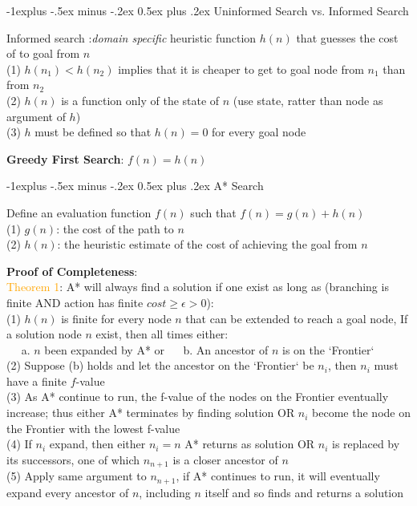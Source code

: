 \documentclass[10pt,landscape]{article}
\makeatletter
\renewcommand{\subsection}{\@startsection{subsection}{2}{0mm}%
                                {-1explus -.5ex minus -.2ex}%
                                {0.5ex plus .2ex}%
                                {\normalfont\normalsize\bfseries}}
\makeatother
\begin{document}
\begin{multicols}{2}
\subsection{Uninformed Search vs. Informed Search}

Informed search :\textit{domain specific} heuristic function $h(n)$ that guesses the cost of to goal from $n$ \\
(1) $h(n_1) < h(n_2)$ implies that it is cheaper to get to goal node from $n_1$ than from $n_2$ \\
(2) $h(n)$ is a function only of the state of $n$ (use state, ratter than node as argument of $h$) \\
(3) $h$ must be defined so that $h(n) = 0$ for every goal node

\textbf{Greedy First Search}: $f(n) = h(n)$



\subsection{A* Search}

Define an evaluation function $f(n)$ such that $f(n) = g(n) + h(n)$ \\
(1) $g(n)$: the cost of the path to $n$  \\
(2) $h(n)$: the heuristic estimate of the cost of achieving the goal from $n$

\textbf{Proof of Completeness}:\\
\textcolor{orange}{Theorem 1}: A* will always find a solution if one exist as long as (branching is finite AND action has finite $cost \ge \epsilon > 0$): \\
(1) $h(n)$ is finite for every node $n$ that can be extended to reach a goal node, If a solution node $n$ exist, then all times either: \\
$\quad$ a. $n$ been expanded by A* or
$\quad$ b. An ancestor of $n$ is on the `Frontier` \\
(2) Suppose (b) holds and let the ancestor on the `Frontier` be $n_i$, then $n_i$ must have a finite $f$-value \\
(3) As A* continue to run, the f-value of the nodes on the Frontier eventually increase; thus either A* terminates by finding solution OR $n_i$ become the node on the Frontier with the lowest f-value \\
(4) If $n_i$ expand, then either $n_i = n$ A* returns as solution OR $n_i$ is replaced by its successors, one of which $n_{n+1}$ is a closer ancestor of $n$ \\
(5) Apply same argument to $n_{n+1}$, if A* continues to run, it will eventually expand every ancestor of $n$, including $n$ itself and so finds and returns a solution


\end{multicols}
\end{document}
